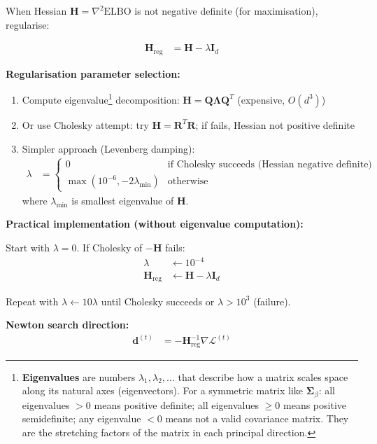\documentclass[11pt,a4paper]{article}
\newcommand{\ELBO}{\text{ELBO}}
\begin{document}
When Hessian $\bm{H} = \nabla^2 \ELBO$ is not negative definite (for maximisation), regularise:

\begin{align}
\bm{H}_{\text{reg}} &= \bm{H} - \lambda \bm{I}_d
\end{align}

\textbf{Regularisation parameter selection:}

\begin{enumerate}
\item Compute eigenvalue\footnote{\textbf{Eigenvalues} are numbers $\lambda_1, \lambda_2, \ldots$ that describe how a matrix scales space along its natural axes (eigenvectors). For a symmetric matrix like $\bm{\Sigma}_\beta$: all eigenvalues $> 0$ means positive definite; all eigenvalues $\geq 0$ means positive semidefinite; any eigenvalue $< 0$ means not a valid covariance matrix. They are the stretching factors of the matrix in each principal direction.} decomposition: $\bm{H} = \bm{Q} \bm{\Lambda} \bm{Q}^T$ (expensive, $O(d^3)$)
\item Or use Cholesky attempt: try $\bm{H} = \bm{R}^T \bm{R}$; if fails, Hessian not positive definite
\item Simpler approach (Levenberg damping):
\begin{align}
\lambda &= \begin{cases}
0 & \text{if Cholesky succeeds (Hessian negative definite)}\\
\max(10^{-6}, -2\lambda_{\min}) & \text{otherwise}
\end{cases}
\end{align}
where $\lambda_{\min}$ is smallest eigenvalue of $\bm{H}$.
\end{enumerate}

\textbf{Practical implementation (without eigenvalue computation):}

Start with $\lambda = 0$. If Cholesky of $-\bm{H}$ fails:
\begin{align}
\lambda &\leftarrow 10^{-4}\\
\bm{H}_{\text{reg}} &\leftarrow \bm{H} - \lambda \bm{I}_d
\end{align}

Repeat with $\lambda \leftarrow 10 \lambda$ until Cholesky succeeds or $\lambda > 10^{3}$ (failure).

\textbf{Newton search direction:}
\begin{align}
\bm{d}^{(t)} &= -\bm{H}_{\text{reg}}^{-1} \nabla \mathcal{L}^{(t)}
\end{align}
\end{document}
